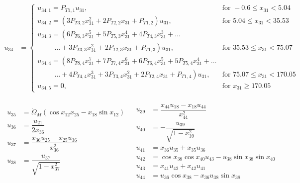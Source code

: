 \begin{equation}
\begin{split}
u_{34}&=\begin{cases}
u_{34,1}=P_{T 1,1}u_{31}, & \text{for } -0.6 \leq x_{31} < 5.04  \\
u_{34,2}=\left(3P_{T 3,2}x_{31}^{2}+2P_{T 2,2}x_{31}+P_{T 1,2}\right)u_{31}, &  \text{for } 5.04\leq x_{31} < 35.53   \\
u_{34,3}=\left(6 P_{T 6,3}x_{31}^{5}+5P_{T 5,3}x_{31}^{4}+4P_{T 4,3}x_{31}^{3}+\dots \right. \\
\qquad \ \  \left. \dotsc +3P_{T 3,3}x_{31}^{2}+2P_{T 2,3}x_{31}+P_{T 1,3}\right)u_{31}, &  \text{for } 35.53\leq x_{31} < 75.07   \\
u_{34,4}=\left(8 P_{T 8,4}x_{31}^{7}+7P_{T 7,4}x_{31}^{6}+6P_{T 6,4}x_{31}^{5}+5P_{T 5,4}x_{31}^{4} + \dots \right. \\
\qquad \ \  \left. \dotsc +4P_{T 4,4}x_{31}^{3}+3P_{T 3,4}x_{31}^{2}+2P_{T 2,4}x_{31}+P_{T 1,4}\right)u_{31}, &  \text{for } 75.07\leq x_{31} < 170.05   \\
u_{34,5}=0, &  \text{for }  x_{31} \geq 170.05   
\end{cases}
\end{split}
\end{equation}

\begin{align} \label{eq:unAuxEq3}
\begin{split}
u_{35} &=  \dot{\Omega}_{M}\left(\cos x_{12}x_{25}-x_{18}\sin x_{12}\right) \\
u_{36} &=  \dfrac{u_{21}}{2x_{36}} \\
u_{37} &= \dfrac{x_{36}u_{25}-x_{25}u_{36}}{x_{36}^{2}} \\
u_{38} &= \dfrac{u_{37}}{\sqrt{1-x_{37}^{2}}} \\ 
\end{split}
&
\begin{split}	
u_{39} &= \dfrac{x_{44}u_{18}-x_{18}u_{44}}{x_{44}^{2}} \\
u_{40} &=  -\dfrac{u_{39}}{\sqrt{1-x_{39}^{2}}}\\
u_{41} &= x_{36}u_{35}+x_{35}u_{36}\\ 
u_{42} &= \cos x_{38} \cos x_{40} u_{43}-u_{38} \sin x_{38} \sin x_{40}\\
u_{43} &= x_{41}u_{42}+x_{42}u_{41} \\ 
u_{44} & = u_{36} \cos x_{38}-x_{36} u_{38}\sin x_{38}\\ 
\end{split}
\end{align}

